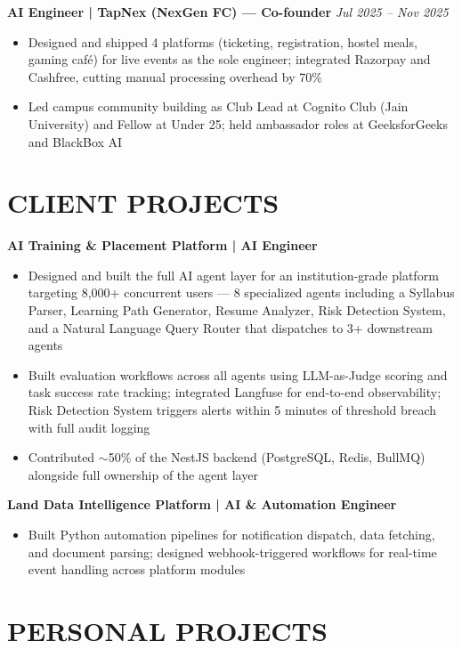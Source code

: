 \documentclass[9.5pt,a4paper]{article}
\begin{document}
\vspace{3pt}
\textbf{AI Engineer | TapNex (NexGen FC) --- Co-founder} \hfill \textit{Jul 2025 -- Nov 2025}
\begin{itemize}
\item Designed and shipped 4 platforms (ticketing, registration, hostel meals, gaming caf\'e) for live events as the sole engineer; integrated Razorpay and Cashfree, cutting manual processing overhead by 70\%
\item Led campus community building as Club Lead at Cognito Club (Jain University) and Fellow at Under 25; held ambassador roles at GeeksforGeeks and BlackBox AI
\end{itemize}

\section*{CLIENT PROJECTS}

\textbf{AI Training \& Placement Platform | AI Engineer}
\begin{itemize}
\item Designed and built the full AI agent layer for an institution-grade platform targeting 8,000+ concurrent users --- 8 specialized agents including a Syllabus Parser, Learning Path Generator, Resume Analyzer, Risk Detection System, and a Natural Language Query Router that dispatches to 3+ downstream agents
\item Built evaluation workflows across all agents using LLM-as-Judge scoring and task success rate tracking; integrated Langfuse for end-to-end observability; Risk Detection System triggers alerts within 5 minutes of threshold breach with full audit logging
\item Contributed $\sim$50\% of the NestJS backend (PostgreSQL, Redis, BullMQ) alongside full ownership of the agent layer
\end{itemize}

\vspace{3pt}
\textbf{Land Data Intelligence Platform | AI \& Automation Engineer}
\begin{itemize}
\item Built Python automation pipelines for notification dispatch, data fetching, and document parsing; designed webhook-triggered workflows for real-time event handling across platform modules
\end{itemize}

\section*{PERSONAL PROJECTS}
\end{document}
